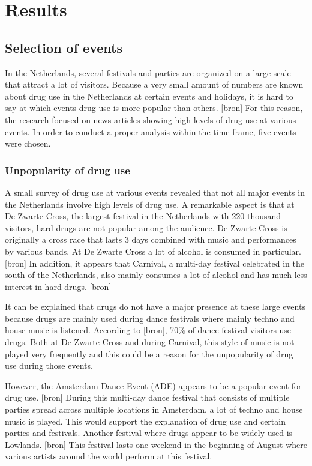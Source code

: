 \section{Results}

\subsection{Selection of events}

In the Netherlands, several festivals and parties are organized on a large scale that attract a lot of visitors. Because a very small amount of numbers are known about drug use in the Netherlands at certain events and holidays, it is hard to say at which events drug use is more popular than others. [bron] For this reason, the research focused on news articles showing high levels of drug use at various events. In order to conduct a proper analysis within the time frame, five events were chosen.  

\subsubsection{Unpopularity of drug use}

A small survey of drug use at various events revealed that not all major events in the Netherlands involve high levels of drug use. A remarkable aspect is that at De Zwarte Cross, the largest festival in the Netherlands with 220 thousand visitors, hard drugs are not popular among the audience. De Zwarte Cross is originally a cross race that lasts 3 days combined with music and performances by various bands. At De Zwarte Cross a lot of alcohol is consumed in particular. [bron] In addition, it appears that Carnival, a multi-day festival celebrated in the south of the Netherlands, also mainly consumes a lot of alcohol and has much less interest in hard drugs. [bron] 

It can be explained that drugs do not have a major presence at these large events because drugs are mainly used during dance festivals where mainly techno and house music is listened. According to [bron], 70\% of dance festival visitors use drugs. Both at De Zwarte Cross and during Carnival, this style of music is not played very frequently and this could be a reason for the unpopularity of drug use during those events.

However, the Amsterdam Dance Event (ADE) appears to be a popular event for drug use. [bron] During this multi-day dance festival that consists of multiple parties spread across multiple locations in Amsterdam, a lot of techno and house music is played. This would support the explanation of drug use and certain parties and festivals. 
Another festival where drugs appear to be widely used is Lowlands. [bron] This festival lasts one weekend in the beginning of August where various artists around the world perform at this festival. 

